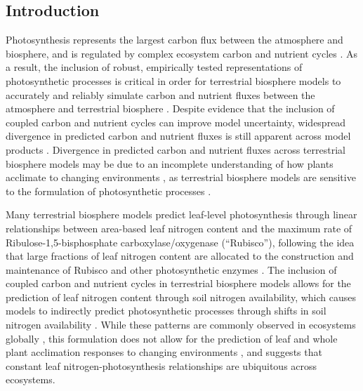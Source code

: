 \begin{singlespace}
    \chapter{\textbf{Introduction}}
\end{singlespace}

Photosynthesis represents the largest carbon flux between the atmosphere and biosphere, and is regulated by complex ecosystem carbon and nutrient cycles . As a result, the inclusion of robust, empirically tested representations of photosynthetic processes is critical in order for terrestrial biosphere models to accurately and reliably simulate carbon and nutrient fluxes between the atmosphere and terrestrial biosphere . Despite evidence that the inclusion of coupled carbon and nutrient cycles can improve model uncertainty, widespread divergence in predicted carbon and nutrient fluxes is still apparent across model products . Divergence in predicted carbon and nutrient fluxes across terrestrial biosphere models may be due to an incomplete understanding of how plants acclimate to changing environments , as terrestrial biosphere models are sensitive to the formulation of photosynthetic processes .

Many terrestrial biosphere models predict leaf-level photosynthesis through linear relationships between area-based leaf nitrogen content and the maximum rate of Ribulose-1,5-bisphosphate carboxylase/oxygenase (``Rubisco''), following the idea that large fractions of leaf nitrogen content are allocated to the construction and maintenance of Rubisco and other photosynthetic enzymes . The inclusion of coupled carbon and nutrient cycles in terrestrial biosphere models  allows for the prediction of leaf nitrogen content through soil nitrogen availability, which causes models to indirectly predict photosynthetic processes through shifts in soil nitrogen availability . While these patterns are commonly observed in ecosystems globally , this formulation does not allow for the prediction of leaf and whole plant acclimation responses to changing environments , and suggests that constant leaf nitrogen-photosynthesis relationships are ubiquitous across ecosystems. 

